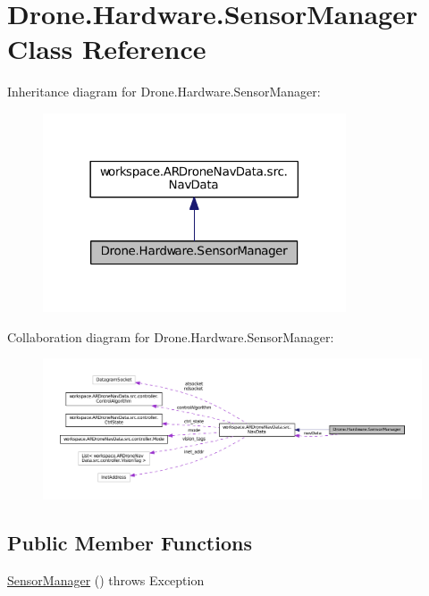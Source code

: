 \hypertarget{class_drone_1_1_hardware_1_1_sensor_manager}{}\section{Drone.\+Hardware.\+Sensor\+Manager Class Reference}
\label{class_drone_1_1_hardware_1_1_sensor_manager}


Inheritance diagram for Drone.\+Hardware.\+Sensor\+Manager\+:\nopagebreak
\begin{figure}[H]
\begin{center}
\leavevmode
\includegraphics[width=254pt]{class_drone_1_1_hardware_1_1_sensor_manager__inherit__graph}
\end{center}
\end{figure}


Collaboration diagram for Drone.\+Hardware.\+Sensor\+Manager\+:\nopagebreak
\begin{figure}[H]
\begin{center}
\leavevmode
\includegraphics[width=350pt]{class_drone_1_1_hardware_1_1_sensor_manager__coll__graph}
\end{center}
\end{figure}
\subsection*{Public Member Functions}
\begin{DoxyCompactItemize}
\item 
\hyperlink{class_drone_1_1_hardware_1_1_sensor_manager_a6c175c89b7b33d51e138b64ec50034ab}{Sensor\+Manager} ()  throws Exception 	
\end{DoxyCompactItemize}
